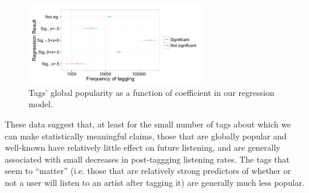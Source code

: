   \begin{figure}
	\centering
      \includegraphics[width=0.7\textwidth]{tagRegressionQualAnalysis}
    \caption{Tags' global popularity as a function of coefficient in our regression model.}
    \label{fig:coefVsPopularity}
  \end{figure}

These data suggest that, at least for the small number of tags about which we can make statistically meaningful claims, those that are globally popular and well-known have relatively little effect on future listening, and are generally associated with small decreases in post-taggging listening rates. The tags that seem to ``matter'' (i.e. those that are relatively strong predictors of whether or not a user will listen to an artist after tagging it) are generally much less popular.